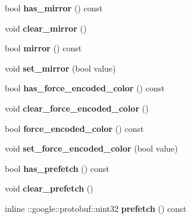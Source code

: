 \begin{DoxyCompactItemize}
bool {\bfseries has\+\_\+mirror} () const
\item 
\mbox{\label{classcaffe_1_1_data_parameter_a2e99b33989b78461851965c8322b7488}} 
void {\bfseries clear\+\_\+mirror} ()
\item 
\mbox{\label{classcaffe_1_1_data_parameter_a94453b612f470401037f0885f9dc1fbc}} 
bool {\bfseries mirror} () const
\item 
\mbox{\label{classcaffe_1_1_data_parameter_af7ac491447893bd665ea6217cf63f40b}} 
void {\bfseries set\+\_\+mirror} (bool value)
\item 
\mbox{\label{classcaffe_1_1_data_parameter_a781c2314f51469045db9b64a1f77d39e}} 
bool {\bfseries has\+\_\+force\+\_\+encoded\+\_\+color} () const
\item 
\mbox{\label{classcaffe_1_1_data_parameter_ad9b0d37dea5582448ea17543399402a1}} 
void {\bfseries clear\+\_\+force\+\_\+encoded\+\_\+color} ()
\item 
\mbox{\label{classcaffe_1_1_data_parameter_a4990a06b541b42550ba2928ed7dc1788}} 
bool {\bfseries force\+\_\+encoded\+\_\+color} () const
\item 
\mbox{\label{classcaffe_1_1_data_parameter_a30f21a510800d1a2cf2c2a83a21cd4de}} 
void {\bfseries set\+\_\+force\+\_\+encoded\+\_\+color} (bool value)
\item 
\mbox{\label{classcaffe_1_1_data_parameter_af24a8d8a085664f536490049e57cd34a}} 
bool {\bfseries has\+\_\+prefetch} () const
\item 
\mbox{\label{classcaffe_1_1_data_parameter_a71884bf55a29257cc94b69b869f7aff2}} 
void {\bfseries clear\+\_\+prefetch} ()
\item 
\mbox{\label{classcaffe_1_1_data_parameter_a2e01f81b2273b29991bcc13ff6195fd7}} 
inline \+::google\+::protobuf\+::uint32 {\bfseries prefetch} () const

\end{DoxyCompactItemize}
